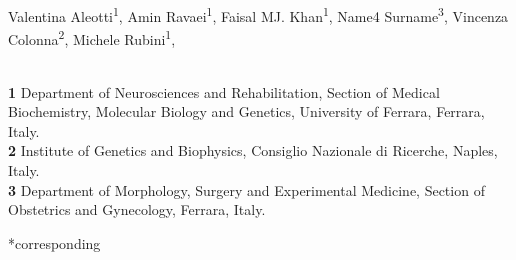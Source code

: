 \documentclass[10pt,letterpaper]{article}
\begin{document}
\vspace*{0.2in}

\begin{flushleft}
{\Large
\textbf{} %
}
\newline
\\
Valentina Aleotti\textsuperscript{1},
Amin Ravaei\textsuperscript{1},
Faisal MJ. Khan\textsuperscript{1},
Name4 Surname\textsuperscript{3},
Vincenza Colonna\textsuperscript{2},
Michele Rubini\textsuperscript{1},

\\
\bigskip
\textbf{1} Department of Neurosciences and Rehabilitation, Section of Medical Biochemistry, Molecular Biology and Genetics, University of Ferrara, Ferrara, Italy.
\\
\textbf{2} Institute of Genetics and Biophysics, Consiglio Nazionale di Ricerche, Naples, Italy.
\\
\textbf{3} Department of Morphology, Surgery and Experimental Medicine, Section of Obstetrics and Gynecology, Ferrara, Italy.
\\
\bigskip

% 
%





*corresponding 


\end{flushleft}
\end{document}
